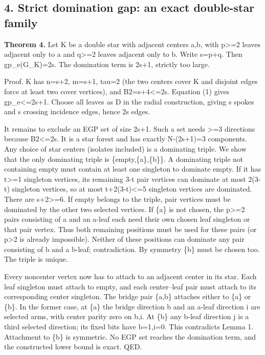 \documentclass[
]{article}
\begin{document}
\subsection{4. Strict domination gap: an exact double-star
family}\label{strict-domination-gap-an-exact-double-star-family}

\textbf{Theorem 4.} Let K be a double star with adjacent centers a,b,
with p\textgreater=2 leaves adjacent only to a and q\textgreater=2
leaves adjacent only to b. Write s=p+q. Then gp\_e(G\_K)=2s. The
domination term is 2s+1, strictly too large.

Proof. K has n=s+2, m=s+1, tau=2 (the two centers cover K and disjoint
edges force at least two cover vertices), and B2=s+4\textless=2s.
Equation (1) gives gp\_e\textless=2s+1. Choose all leaves as D in the
radial construction, giving s spokes and s crossing incidence edges,
hence 2s edges.

It remains to exclude an EGP set of size 2s+1. Such a set needs
\textgreater=3 directions because B2\textless=2s. It is a star forest
and has exactly N-(2s+1)=3 components. Any choice of star centers
(isolates included) is a dominating triple. We show that the only
dominating triple is \{empty,\{a\},\{b\}\}. A dominating triple not
containing empty must contain at least one singleton to dominate empty.
If it has t\textgreater=1 singleton vertices, its remaining 3-t pair
vertices can dominate at most 2(3-t) singleton vertices, so at most
t+2(3-t)\textless=5 singleton vertices are dominated. There are
s+2\textgreater=6. If empty belongs to the triple, pair vertices must be
dominated by the other two selected vertices. If \{a\} is not chosen,
the p\textgreater=2 pairs consisting of a and an a-leaf each need their
own chosen leaf singleton or that pair vertex. Thus both remaining
positions must be used for these pairs (or p\textgreater2 is already
impossible). Neither of these positions can dominate any pair consisting
of b and a b-leaf; contradiction. By symmetry \{b\} must be chosen too.
The triple is unique.

Every noncenter vertex now has to attach to an adjacent center in its
star. Each leaf singleton must attach to empty, and each center--leaf
pair must attach to its corresponding center singleton. The bridge pair
\{a,b\} attaches either to \{a\} or \{b\}. In the former case, at \{a\}
the bridge direction b and an a-leaf direction i are selected arms, with
center parity zero on b,i. At \{b\} any b-leaf direction j is a third
selected direction; its fixed bits have b=1,i=0. This contradicts Lemma
1. Attachment to \{b\} is symmetric. No EGP set reaches the domination
term, and the constructed lower bound is exact. QED.
\end{document}
